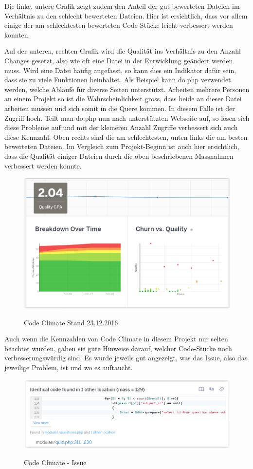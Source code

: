 Die linke, untere Grafik zeigt zudem den Anteil der gut bewerteten Dateien im Verhältnis zu den schlecht bewerteten Dateien. Hier ist ersichtlich, dass vor allem einige der am schlechtesten bewerteten Code-Stücke leicht verbessert werden konnten.

Auf der unteren, rechten Grafik wird die Qualität ins Verhältnis zu den Anzahl Changes gesetzt, also wie oft eine Datei in der Entwicklung geändert werden muss. Wird eine Datei häufig angefasst, so kann dies ein Indikator dafür sein, dass sie zu viele Funktionen beinhaltet. Als Beispiel kann do.php verwendet werden, welche Abläufe für diverse Seiten unterstützt. Arbeiten mehrere Personen an einem Projekt so ist die Wahrscheinlichkeit gross, dass beide an dieser Datei arbeiten müssen und sich somit in die Quere kommen. In diesem Falle ist der Zugriff hoch. Teilt man do.php nun nach unterstützten Webseite auf, so lösen sich diese Probleme auf und mit der kleineren Anzahl Zugriffe verbessert sich auch diese Kennzahl. Oben rechts sind die am schlechtesten, unten links die am besten bewerteten Dateien. Im Vergleich zum Projekt-Beginn ist auch hier ersichtlich, dass die Qualität einiger Dateien durch die oben beschriebenen Massnahmen verbessert werden konnte.

\begin{figure}[H]
	\centering
	\includegraphics[width=.7\textwidth]{Images/CodeClimate_Ende.PNG}
	\caption{Code Climate Stand 23.12.2016}
	\cite{codeclimate.com}
\end{figure}

Auch wenn die Kennzahlen von Code Climate in diesem Projekt nur selten beachtet wurden, gaben sie gute Hinweise darauf, welcher Code-Stücke noch verbesserungswürdig sind. Es wurde jeweils gut angezeigt, was das Issue, also das jeweilige Problem, ist und wo es auftaucht.

\begin{figure}[H]
	\centering
	\includegraphics[width=.7\textwidth]{Images/CodeClimate_Issue.PNG}
	\caption{Code Climate - Issue}
	\cite{codeclimate.com}
\end{figure}



